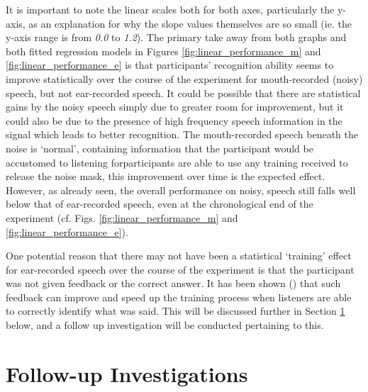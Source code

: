 It is important to note the linear scales both for both axes, particularly the y-axis, as an explanation for why the slope values themselves are so small (ie. the y-axis range is from \textit{0.0} to \textit{1.2}).  The primary take away from both graphs and both fitted regression models in Figures \ref{fig:linear_performance_m} and \ref{fig:linear_performance_e} is that participants' recognition ability seems to improve statistically over the course of the experiment for mouth-recorded (noisy) speech, but not ear-recorded speech.  It could be possible that there are statistical gains by the noisy speech simply due to greater room for improvement, but it could also be due to the presence of high frequency speech information in the signal which leads to better recognition. The mouth-recorded speech beneath the noise is `normal', containing \DIFdelbegin {}\DIFdelend \DIFaddbegin {}\DIFaddend information that the participant would be accustomed to listening for\DIFdelbegin {}\DIFdelend \DIFaddbegin {}\DIFaddend participants are able to use any training received to release the noise mask, this improvement over time is the expected effect.  However, as already seen, the overall performance on noisy, \DIFdelbegin {}\DIFdelend \DIFaddbegin {}\DIFaddend speech still falls well below that of ear-recorded speech, even at the chronological end of the experiment (cf. Figs. \ref{fig:linear_performance_m} and \ref{fig:linear_performance_e}).

One potential reason that there may not have been a statistical `training' effect for ear-recorded speech over the course of the experiment is that the participant was not given feedback or the correct answer.  It has been shown (\cite{davis:05}) that such feedback can improve and speed up the training process when listeners are able to correctly identify what was said.  This will be discussed further in Section \ref{chap3:follow-up-expts} below, and a follow up investigation will be conducted pertaining to this.


\section{Follow-up Investigations}
\label{chap3:follow-up-expts}

